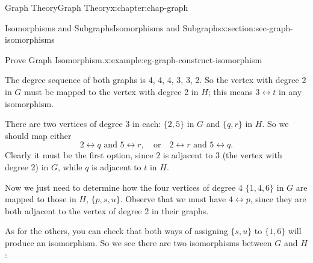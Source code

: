 \documentclass[oneside,10pt,]{book}
\newcommand{\tabularfont}{\relax}
\numberwithin{equation}{section}
\newcommand{\hrulemedium}{\noalign{\hrule height 0.07em}}
\begin{document}
\begin{chapterptx}{Graph Theory}{}{Graph Theory}{}{}{x:chapter:chap-graph}
\begin{sectionptx}{Isomorphisms and Subgraphs}{}{Isomorphisms and Subgraphs}{}{}{x:section:sec-graph-isomorphisms}
\begin{example}{Prove Graph Isomorphism.}{x:example:eg-graph-construct-isomorphism}
\begin{sidebyside}{2}{0.22}{0.22}{0.16}
\begin{sbspanel}{0.2}
{
}%
\end{sbspanel}%
\end{sidebyside}%
\par
The degree sequence of both graphs is 4, 4, 4, 3, 3, 2. So the vertex with degree 2 in \(G\) must be mapped to the vertex with degree 2 in \(H\); this means \(3 \leftrightarrow t\) in any isomorphism.%
\par
There are two vertices of degree 3 in each: \(\{2,5\}\) in \(G\) and \(\{q,r\}\) in \(H\). So we should map either%
\begin{equation*}
2 \leftrightarrow q \text{ and } 5 \leftrightarrow r, \quad \text{or} \quad 2 \leftrightarrow r \text{ and } 5 \leftrightarrow q\text{.}
\end{equation*}
Clearly it must be the first option, since \(2\) is adjacent to \(3\) (the vertex with degree 2) in \(G\), while \(q\) is adjacent to \(t\) in \(H\).%
\par
Now we just need to determine how the four vertices of degree 4 \(\{1, 4, 6\}\) in \(G\) are mapped to those in \(H\), \(\{p, s, u\}\). Observe that we must have \(4 \leftrightarrow p\), since they are both adjacent to the vertex of degree 2 in their graphs.%
\par
As for the others, you can check that both ways of assigning \(\{s,u\}\) to \(\{1,6\}\) will produce an isomorphism. So we see there are two isomorphisms between \(G\) and \(H\):%
\begin{sidebyside}{2}{0.05}{0.05}{0.1}%
\begin{sbspanel}{0.4}%
\resizebox{\linewidth}{!}{%
{\centering%
{\tabularfont%
\begin{tabular}{ccccccc}
\(G\)&\(3\)&\(2\)&\(5\)&\(4\)&\(1\)&\(6\)\tabularnewline\hrulemedium
\(H\)&\(t\)&\(q\)&\(r\)&\(p\)&\(s\)&\(u\)
\end{tabular}
}%
\par}
}%
\end{sbspanel}%
\begin{sbspanel}{0.4}%
\resizebox{\linewidth}{!}{%
}
\end{sbspanel}
\end{sidebyside}
\end{example}
\end{sectionptx}
\end{chapterptx}
\end{document}
